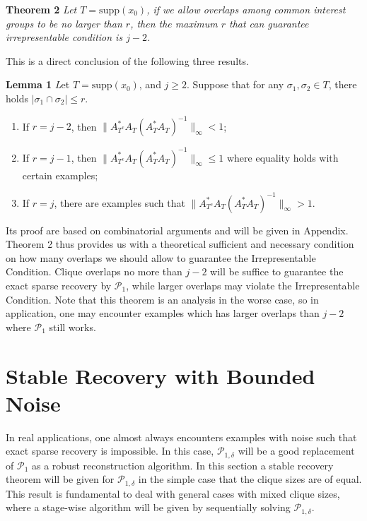 \documentclass{article}
\begin{document}
\textbf{Theorem 2} \textit{Let $T=\mbox{supp}(x_0)$, if we allow overlaps among common interest groups to be 
no larger than $r$, then the maximum $r$ that can guarantee irrepresentable condition is $j-2$. } 

This is a direct conclusion of the following three results.

\textbf{Lemma 1} {\textit Let $T=\mbox{supp}(x_0)$, and $j\ge 2$. Suppose that for any $\sigma_1, \sigma_2\in T$, there holds $|\sigma_1\cap \sigma_2|\le r$.}
\begin{enumerate}
\item If $r=j-2$, then $\|A^*_{T^c}A_T(A^*_TA_T)^{-1}\|_\infty<1$; 
\item If $r=j-1$, then $\|A^*_{T^c}A_T(A^*_TA_T)^{-1}\|_\infty\le 1$ where equality holds with certain examples; 
\item If $r=j$, there are examples such that $\|A^*_{T^c}A_T(A^*_TA_T)^{-1}\|_\infty>1$.
\end{enumerate}

Its proof are based on combinatorial arguments and will be given in Appendix. Theorem 2 thus provides us with a theoretical sufficient and necessary condition on how many overlaps 
we should allow to guarantee the Irrepresentable Condition. 
Clique overlaps no more than $j-2$ will be suffice to guarantee the exact sparse recovery by $\mathcal{P}_1$, while larger overlaps may violate the Irrepresentable Condition. Note that this theorem is an analysis in the worse case, so in application, one may encounter examples which has larger overlaps than $j-2$ where $\mathcal{P}_1$ still works.    


\section{Stable Recovery with Bounded Noise}

In real applications, one almost always encounters examples with noise such that exact sparse recovery is impossible. 
In this case, $\mathcal{P}_{1, \delta}$ will be a good replacement of $\mathcal{P}_1$ as a robust 
reconstruction algorithm. 
In this section a stable recovery theorem will be given for $\mathcal{P}_{1, \delta}$ in the 
simple case that the clique sizes are of equal. 
This result is fundamental to deal with general cases with mixed clique sizes, 
where a stage-wise algorithm will be given by sequentially solving $\mathcal{P}_{1, \delta}$. 
 
\end{document}
